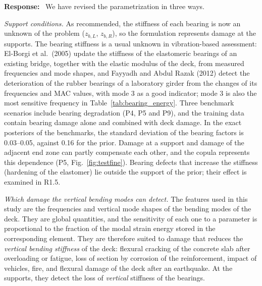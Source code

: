 \documentclass[11pt]{article}
\newenvironment{response}{\par\smallskip\noindent\color{resp}\textbf{Response:}\ }{\par}
\begin{document}
\begin{response}
We have revised the parametrization in three ways.

\textit{Support conditions.} As recommended, the stiffness of each bearing is now an unknown of the problem
($z_{b,L}$, $z_{b,R}$), so the formulation represents damage at the supports. The bearing stiffness is a usual unknown in
vibration-based assessment: El-Borgi et al.\ (2005) update the stiffness of the elastomeric bearings of an existing
bridge, together with the elastic modulus of the deck, from measured frequencies and mode shapes, and Fayyadh and Abdul
Razak (2012) detect the deterioration of the rubber bearings of a laboratory girder from the changes of its frequencies
and MAC values, with mode 3 as a good indicator; mode 3 is also the most sensitive frequency in Table~\ref{tab:bearing_energy}. Three benchmark
scenarios include bearing degradation (P4, P5 and P9), and the training data contain bearing damage alone and combined with deck damage. In
the exact posteriors of the benchmarks, the standard deviation of the bearing factors is 0.03--0.05, against 0.16 for the prior. Damage at a
support and damage of the adjacent end zone can partly compensate each other, and the copula represents this dependence (P5,
Fig.~\ref{fig:testfine}). Bearing defects that increase the stiffness (hardening of the elastomer) lie
outside the support of the prior; their effect is examined in R1.5.

\textit{Which damage the vertical bending modes can detect.} The features used in this study are the frequencies and
vertical mode shapes of the bending modes of the deck. They are global quantities, and the sensitivity of each one to a
parameter is proportional to the fraction of the modal strain energy stored in the corresponding element. They are
therefore suited to damage that reduces the \emph{vertical bending stiffness} of the deck: flexural cracking of the
concrete slab after overloading or fatigue, loss of section by corrosion of the reinforcement,
impact of vehicles, fire, and flexural damage of the deck after an
earthquake. At the supports, they detect the loss of \emph{vertical} stiffness of the bearings.


\end{response}
\end{document}

